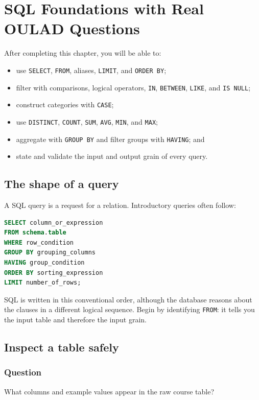 \chapter{SQL Foundations with Real OULAD Questions}
\label{ch:sql-foundations}

\begin{learningobjectives}
After completing this chapter, you will be able to:
\begin{itemize}
  \item use \texttt{SELECT}, \texttt{FROM}, aliases, \texttt{LIMIT}, and
    \texttt{ORDER BY};
  \item filter with comparisons, logical operators, \texttt{IN},
    \texttt{BETWEEN}, \texttt{LIKE}, and \texttt{IS NULL};
  \item construct categories with \texttt{CASE};
  \item use \texttt{DISTINCT}, \texttt{COUNT}, \texttt{SUM}, \texttt{AVG},
    \texttt{MIN}, and \texttt{MAX};
  \item aggregate with \texttt{GROUP BY} and filter groups with
    \texttt{HAVING}; and
  \item state and validate the input and output grain of every query.
\end{itemize}
\end{learningobjectives}

\section{The shape of a query}

A SQL query is a request for a relation. Introductory queries often follow:

\begin{lstlisting}[language=SQL]
SELECT column_or_expression
FROM schema.table
WHERE row_condition
GROUP BY grouping_columns
HAVING group_condition
ORDER BY sorting_expression
LIMIT number_of_rows;
\end{lstlisting}

SQL is written in this conventional order, although the database reasons about
the clauses in a different logical sequence. Begin by identifying
\texttt{FROM}: it tells you the input table and therefore the input grain.

\section{Inspect a table safely}

\subsection{Question}
What columns and example values appear in the raw course table?


